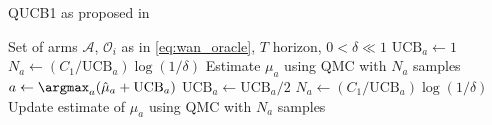 \begin{algorithm}
    \caption{QUCB1 as proposed in \autocite{wan2022}}
    \label{alg:qucb1}
    \begin{algorithmic}[1]
        \Require Set of arms $\mathcal{A}$, $\mathcal{O}_i$ as in \cref{eq:wan_oracle}, $T$ horizon, $0 < \delta \ll 1$
        \State $\text{UCB}_a \gets 1$
        \State $N_a \gets (C_1/\text{UCB}_a) \log(1/\delta)$
        \State Estimate $\mu_a$ using QMC with $N_a$ samples
        \EndFor
        \State $a \gets \argmax_a (\hat\mu_a + \text{UCB}_a)$
        \State $\text{UCB}_a \gets \text{UCB}_a /2$
        \State $N_a \gets (C_1/\text{UCB}_a) \log(1/\delta)$
        \State Update estimate of $\mu_a$ using QMC with $N_a$ samples
        \EndWhile
    \end{algorithmic}
\end{algorithm}
